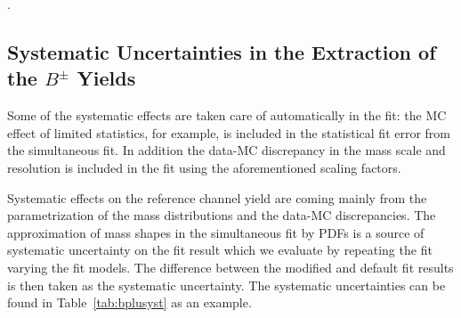 \clearpage
\begin{table}[!htb]
    \begin{center}
	\label{tab:bplusfit3pars}.
    \end{center}
\end{table}

\subsection{Systematic Uncertainties in the Extraction of the $B^\pm$ Yields}
\label{sec:bplusyst}

Some of the systematic effects are taken care of automatically in the fit:
the MC effect of limited statistics, for example, is included in the statistical
fit error from the simultaneous fit. In addition the data-MC discrepancy in the
mass scale and resolution is included in the fit using the aforementioned scaling
factors.

Systematic effects on the reference channel yield are coming mainly from the parametrization
of the mass distributions and the data-MC discrepancies. The approximation of mass shapes in the
simultaneous fit by PDFs is a source of systematic uncertainty on the fit result which
we evaluate by repeating the fit varying the fit models. The difference between the modified
and default fit results is then taken as the systematic uncertainty.
The systematic uncertainties can be found in Table~\ref{tab:bplusyst} as
an example. 

